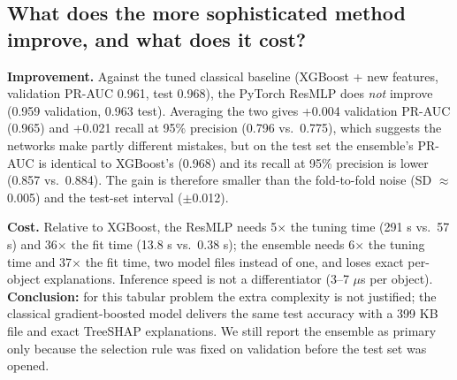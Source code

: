 \documentclass[11pt,a4paper]{article}
\begin{document}
\subsection{What does the more sophisticated method improve, and what does it cost?}\label{sec:l2}
\textbf{Improvement.} Against the tuned classical baseline (XGBoost + new features, validation PR-AUC 0.961, test 0.968), the PyTorch ResMLP does \emph{not} improve (0.959 validation, 0.963 test). Averaging the two gives +0.004 validation PR-AUC (0.965) and +0.021 recall at 95\% precision (0.796 vs.\ 0.775), which suggests the networks make partly different mistakes, but on the test set the ensemble's PR-AUC is identical to XGBoost's (0.968) and its recall at 95\% precision is lower (0.857 vs.\ 0.884). The gain is therefore smaller than the fold-to-fold noise (SD $\approx$ 0.005) and the test-set interval ($\pm$0.012).

\textbf{Cost.} Relative to XGBoost, the ResMLP needs 5$\times$ the tuning time (291 s vs.\ 57 s) and 36$\times$ the fit time (13.8 s vs.\ 0.38 s); the ensemble needs 6$\times$ the tuning time and 37$\times$ the fit time, two model files instead of one, and loses exact per-object explanations. Inference speed is not a differentiator (3--7 $\mu$s per object). \textbf{Conclusion:} for this tabular problem the extra complexity is not justified; the classical gradient-boosted model delivers the same test accuracy with a 399 KB file and exact TreeSHAP explanations. We still report the ensemble as primary only because the selection rule was fixed on validation before the test set was opened.
\end{document}
